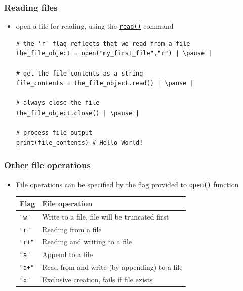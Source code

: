 \documentclass[xcolor=table]{beamer}
\begin{document}
\begin{frame}[fragile]
    \frametitle{Reading files}
\begin{itemize}
    \item open a file for reading, using the \href{https://docs.python.org/3/library/functions.html#read}{\texttt{read()}} command \pause
\begin{lstlisting}[style=python]
# the 'r' flag reflects that we read from a file
the_file_object = open("my_first_file","r") | \pause |

# get the file contents as a string
file_contents = the_file_object.read() | \pause |

# always close the file
the_file_object.close() | \pause |

# process file output
print(file_contents) # Hello World!
\end{lstlisting}
\end{itemize}
\end{frame}


\begin{frame}[fragile]
    \frametitle{Other file operations}
\begin{itemize}
    \item File operations can be specified by the flag provided to \href{https://docs.python.org/3/library/functions.html#open}{\texttt{open()}} function \pause 
\begin{center}
    \begin{tabular}{|l|l|}\hline
        Flag & File operation \\ \hline
        \texttt{"w"}
    & Write to a file, file will be truncated first \\
        \texttt{"r"} & Reading from a file \\
        \texttt{"r+"} & Reading and writing to a file \\
        \texttt{"a"} & Append to a file \\
        \texttt{"a+"} & Read from and write (by appending) to a file \\
        \texttt{"x"} & Exclusive creation, fails if file exists \\ \hline
    \end{tabular}
\end{center}
\end{itemize}
\end{frame}
\end{document}

